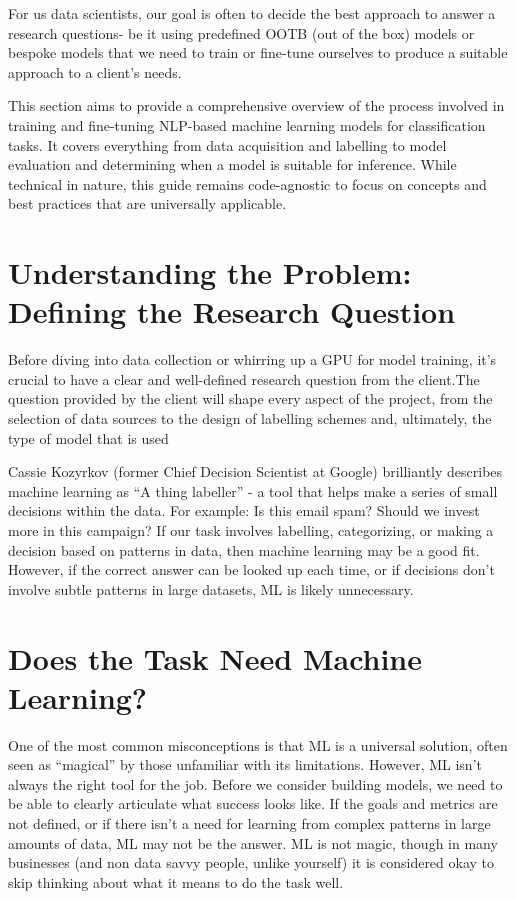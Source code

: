 \documentclass[
  letterpaper,
  DIV=11,
  numbers=noendperiod]{scrreprt}
\begin{document}
For us data scientists, our goal is often to decide the best approach to
answer a research questions- be it using predefined OOTB (out of the
box) models or bespoke models that we need to train or fine-tune
ourselves to produce a suitable approach to a client's needs.

This section aims to provide a comprehensive overview of the process
involved in training and fine-tuning NLP-based machine learning models
for classification tasks. It covers everything from data acquisition and
labelling to model evaluation and determining when a model is suitable
for inference. While technical in nature, this guide remains
code-agnostic to focus on concepts and best practices that are
universally applicable.

\section{Understanding the Problem: Defining the Research
Question}\label{understanding-the-problem-defining-the-research-question}

Before diving into data collection or whirring up a GPU for model
training, it's crucial to have a clear and well-defined research
question from the client.The question provided by the client will shape
every aspect of the project, from the selection of data sources to the
design of labelling schemes and, ultimately, the type of model that is
used

Cassie Kozyrkov (former Chief Decision Scientist at Google) brilliantly
describes machine learning as ``A thing labeller'' - a tool that helps
make a series of small decisions within the data. For example: Is this
email spam? Should we invest more in this campaign? If our task involves
labelling, categorizing, or making a decision based on patterns in data,
then machine learning may be a good fit. However, if the correct answer
can be looked up each time, or if decisions don't involve subtle
patterns in large datasets, ML is likely unnecessary.

\section{Does the Task Need Machine
Learning?}\label{does-the-task-need-machine-learning}

One of the most common misconceptions is that ML is a universal
solution, often seen as ``magical'' by those unfamiliar with its
limitations. However, ML isn't always the right tool for the job. Before
we consider building models, we need to be able to clearly articulate
what success looks like. If the goals and metrics are not defined, or if
there isn't a need for learning from complex patterns in large amounts
of data, ML may not be the answer. ML is not magic, though in many
businesses (and non data savvy people, unlike yourself) it is considered
okay to skip thinking about what it means to do the task well.
\end{document}
